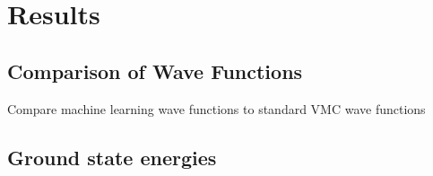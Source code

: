 \chapter{Results} \label{sec:results}

\section{Comparison of Wave Functions}
Compare machine learning wave functions to standard VMC wave functions

\section{Ground state energies}